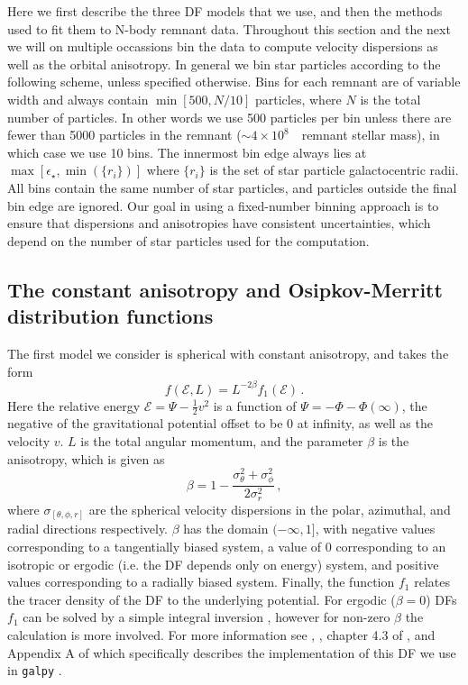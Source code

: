 Here we first describe the three DF models that we use, and then the methods used to fit them to N-body remnant data. Throughout this section and the next we will on multiple occassions bin the data to compute velocity dispersions as well as the orbital anisotropy. In general we bin star particles according to the following scheme, unless specified otherwise. Bins for each remnant are of variable width and always contain $\min[500,N/10]$ particles, where $N$ is the total number of particles. In other words we use 500 particles per bin unless there are fewer than 5000 particles in the remnant ($\sim 4\times10^{8}$~\Msun\ remnant stellar mass), in which case we use 10 bins. The innermost bin edge always lies at $\max[\epsilon_{\star},\min(\{ r_{i} \})]$ where $\{r_{i}\}$ is the set of star particle galactocentric radii. All bins contain the same number of star particles, and particles outside the final bin edge are ignored. Our goal in using a fixed-number binning approach is to ensure that dispersions and anisotropies have consistent uncertainties, which depend on the number of star particles used for the computation.

\subsection{The constant anisotropy and Osipkov-Merritt distribution functions}
\label{ch4:subsec:distribution-function-models}

The first model we consider is spherical with constant anisotropy, and takes the form
\begin{equation}
    \label{ch4:eq:constant-anisotropy-df}
    f(\mathcal{E},L) = L^{-2\beta} f_{1}(\mathcal{E})\,.
\end{equation}
\noindent Here the relative energy $\mathcal{E} = \Psi - \frac{1}{2}v^{2}$ is a function of $\Psi = -\Phi-\Phi(\infty)$, the negative of the gravitational potential offset to be 0 at infinity, as well as the velocity $v$. $L$ is the total angular momentum, and the parameter $\beta$ is the anisotropy, which is given as
\begin{equation}
    \label{ch4:eq:beta}
    \beta = 1- \frac{\sigma^{2}_{\theta} + \sigma^{2}_{\phi}}{2\sigma^{2}_{r}}\,,
\end{equation}
\noindent where $\sigma_{[\theta,\phi,r]}$ are the spherical velocity dispersions in the polar, azimuthal, and radial directions respectively. $\beta$ has the domain $(-\infty,1]$, with negative values corresponding to a tangentially biased system, a value of 0 corresponding to an isotropic or ergodic (i.e. the DF depends only on energy) system, and positive values corresponding to a radially biased system. Finally, the function $f_{1}$ relates the tracer density of the DF to the underlying potential. For ergodic ($\beta=0$) DFs $f_{1}$ can be solved by a simple integral inversion \parencite{eddington16}, however for non-zero $\beta$ the calculation is more involved. For more information see \textcite{cuddeford91}, \textcite{an06}, chapter 4.3 of \textcite{binney08}, and Appendix A of \textcite{lane22} which specifically describes the implementation of this DF we use in \texttt{galpy} \parencite{bovy15}.

